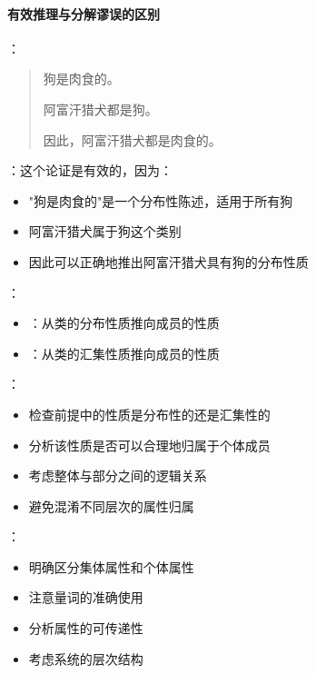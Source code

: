 \paragraph{有效推理与分解谬误的区别}
\begin{examplebox}[title=有效推理与分解谬误的区别]
：

\begin{quote}
狗是肉食的。

阿富汗猎犬都是狗。

因此，阿富汗猎犬都是肉食的。
\end{quote}

：这个论证是有效的，因为：
\begin{itemize}
  \item "狗是肉食的"是一个分布性陈述，适用于所有狗
  \item 阿富汗猎犬属于狗这个类别
  \item 因此可以正确地推出阿富汗猎犬具有狗的分布性质
\end{itemize}

：
\begin{itemize}
  \item {}：从类的分布性质推向成员的性质
  \item {}：从类的汇集性质推向成员的性质
\end{itemize}

：
\begin{itemize}
  \item 检查前提中的性质是分布性的还是汇集性的
  \item 分析该性质是否可以合理地归属于个体成员
  \item 考虑整体与部分之间的逻辑关系
  \item 避免混淆不同层次的属性归属
\end{itemize}

：
\begin{itemize}
  \item 明确区分集体属性和个体属性
  \item 注意量词的准确使用
  \item 分析属性的可传递性
  \item 考虑系统的层次结构
\end{itemize}
\end{examplebox}